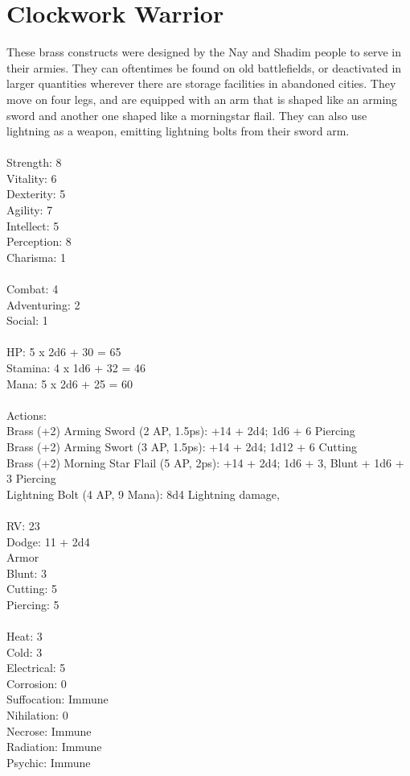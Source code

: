 \section{Clockwork Warrior}

These brass constructs were designed by the Nay and Shadim people to serve in their armies. They can oftentimes be found on old battlefields, or deactivated in larger quantities wherever there are storage facilities in abandoned cities. They move on four legs, and are equipped with an arm that is shaped like an arming sword and another one shaped like a morningstar flail. They can also use lightning as a weapon, emitting lightning bolts from their sword arm.\\
\\
Strength: 8\\
Vitality: 6\\
Dexterity: 5\\
Agility: 7\\
Intellect: 5\\
Perception: 8\\
Charisma: 1\\
\\
Combat: 4\\
Adventuring: 2\\
Social: 1\\
\\
HP: 5 x 2d6 + 30 = 65\\
Stamina: 4 x 1d6 + 32 = 46\\
Mana: 5 x 2d6 + 25 = 60\\
\\
Actions:\\
Brass (+2) Arming Sword (2 AP, 1.5ps): +14 + 2d4; 1d6 + 6 Piercing\\
Brass (+2) Arming Swort (3 AP, 1.5ps): +14 + 2d4; 1d12 + 6 Cutting\\
Brass (+2) Morning Star Flail (5 AP, 2ps): +14 + 2d4; 1d6 + 3, Blunt + 1d6 + 3 Piercing\\
Lightning Bolt (4 AP, 9 Mana): 8d4 Lightning damage,\\
\\
RV: 23\\
Dodge: 11 + 2d4\\
Armor\\
Blunt: 3\\
Cutting: 5\\
Piercing: 5\\
\\
Heat: 3\\
Cold: 3\\
Electrical: 5\\
Corrosion: 0\\
Suffocation: Immune\\
Nihilation: 0\\
Necrose: Immune\\
Radiation: Immune\\
Psychic: Immune\\